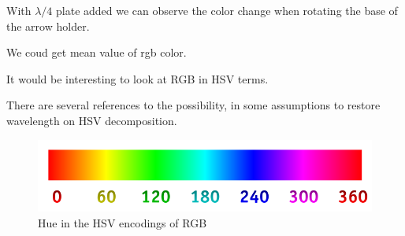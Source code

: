 With $\lambda/4$ plate added we can observe the color change when rotating the base of the arrow holder.

\phantom{42}


\begin{minipage}{0.3\textwidth}
    \begin{figure}[h]
    \flushleft
    \vspace{-5mm}
    \end{figure}
\end{minipage}
\hfill
\begin{minipage}{0.65\textwidth}
We coud get mean value of rgb color.


It would be interesting to look at RGB in HSV terms. 

\phantom{42}

There are several references to the possibility, in some assumptions to restore wavelength on HSV decomposition.
    \begin{figure}[h]
        \centering
        \includegraphics[width=1\textwidth]{figures/HueScale.png}
        \caption{Hue in the HSV encodings of RGB}
    \end{figure}
\end{minipage}